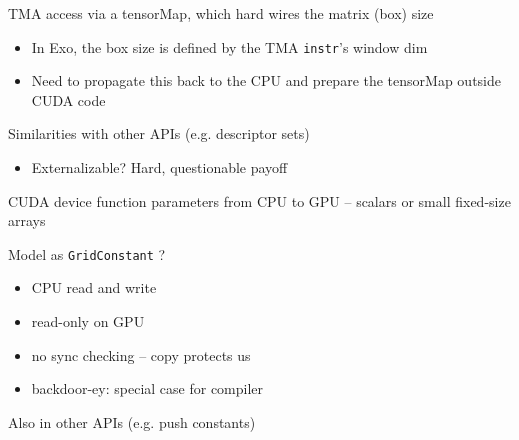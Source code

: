 \begin{minipage}[t]{0.48\textwidth}\fixminipage
{}

TMA access  via a tensorMap, which hard wires the  matrix (box) size
\begin{itemize}
  \item In Exo, the box size is defined by the TMA \texttt{instr}'s window dim
  \item Need to propagate this back to the CPU and prepare the tensorMap outside CUDA code
\end{itemize}

Similarities with other APIs (e.g. descriptor sets)
\begin{itemize}
  \item Externalizable? Hard, questionable payoff
\end{itemize}


CUDA device function parameters  from CPU to GPU -- scalars or small fixed-size arrays

Model as \texttt{GridConstant} ?
\begin{itemize}
  \item CPU read and write
  \item read-only on GPU
  \item no sync checking -- copy protects us
  \item backdoor-ey: special case for compiler
\end{itemize}
Also in other APIs (e.g. push constants)
\end{minipage}
\newpage
{}

